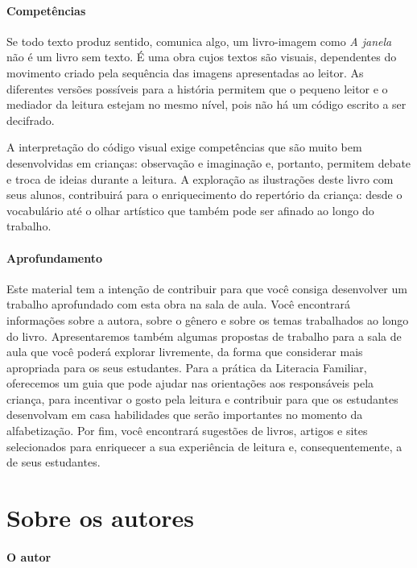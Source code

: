 \documentclass[11pt]{extarticle}
\begin{document}
\paragraph{Competências}
Se todo texto produz sentido, comunica algo, 
um livro-imagem como \textit{A janela} não é um livro sem texto. É uma 
obra cujos textos são visuais, dependentes do movimento criado pela 
sequência das imagens apresentadas ao leitor. As diferentes versões possíveis 
para a história permitem que o pequeno leitor e o mediador da leitura estejam 
no mesmo nível, pois não há um código escrito a ser decifrado. 

A interpretação do código visual 
exige competências que são muito bem desenvolvidas em crianças: 
observação e imaginação e, portanto, permitem debate e troca de ideias durante 
a leitura. A exploração as ilustrações deste livro com seus alunos, contribuirá 
para o enriquecimento do repertório da criança: desde o vocabulário até o 
olhar artístico que também pode ser afinado ao longo do trabalho.


\paragraph{Aprofundamento} Este material tem a 
intenção de contribuir para que você consiga desenvolver um trabalho aprofundado 
com esta obra na sala de aula. Você encontrará informações sobre a autora, sobre 
o gênero e sobre os temas trabalhados ao longo do livro. Apresentaremos também 
algumas propostas de trabalho para a sala de aula que você poderá explorar livremente, 
da forma que considerar mais apropriada para os seus estudantes. Para a prática 
da Literacia Familiar, oferecemos um guia que pode ajudar nas orientações aos 
responsáveis pela criança, para incentivar o gosto pela leitura e contribuir para 
que os estudantes desenvolvam em casa habilidades que serão importantes no momento 
da alfabetização. Por fim, você encontrará sugestões de livros, artigos e sites 
selecionados para enriquecer a sua experiência de leitura e, 
consequentemente, a de seus estudantes.



\section{Sobre os autores}

\paragraph{O autor} 
\end{document}
